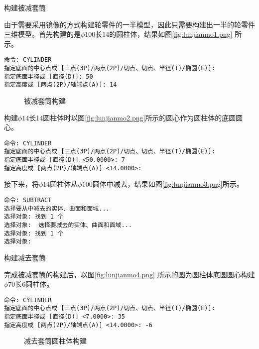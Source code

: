 \begin{procedure}
\item 构建被减套筒

由于需要采用镜像的方式构建轮零件的一半模型，因此只需要构建出一半的轮零件三维模型。首先构建的是$\phi 100$长14的圆柱体，结果如图\ref{fig:lunjianmo1.png} 所示。
\begin{lstlisting}
命令: CYLINDER
指定底面的中心点或 [三点(3P)/两点(2P)/切点、切点、半径(T)/椭圆(E)]:
指定底面半径或 [直径(D)]: 50
指定高度或 [两点(2P)/轴端点(A)]: 14
\end{lstlisting}
\begin{figure}[htbp]
\centering
{}\hspace{20pt}
\hspace{20pt}
\caption{被减套筒构建}
\end{figure}

构建$\phi 14$长14圆柱体时以图\ref{fig:lunjianmo2.png}所示的圆心作为圆柱体的底圆圆心。
\begin{lstlisting}
命令: CYLINDER
指定底面的中心点或 [三点(3P)/两点(2P)/切点、切点、半径(T)/椭圆(E)]:
指定底面半径或 [直径(D)] <50.0000>: 7
指定高度或 [两点(2P)/轴端点(A)] <14.0000>:
\end{lstlisting}

接下来，将$\phi 14$圆柱体从$\phi 100$圆体中减去，结果如图\ref{fig:lunjianmo3.png}所示。
\begin{lstlisting}
命令: SUBTRACT
选择要从中减去的实体、曲面和面域...
选择对象: 找到 1 个
选择对象:  选择要减去的实体、曲面和面域...
选择对象: 找到 1 个
选择对象:
\end{lstlisting}

\item 构建减去套筒

完成被减套筒的构建后，以图\ref{fig:lunjianmo4.png} 所示的圆为圆柱体底圆圆心构建$\phi 70$长6圆柱体。
\begin{lstlisting}
命令: CYLINDER
指定底面的中心点或 [三点(3P)/两点(2P)/切点、切点、半径(T)/椭圆(E)]:
指定底面半径或 [直径(D)] <7.0000>: 35
指定高度或 [两点(2P)/轴端点(A)] <14.0000>: -6
\end{lstlisting}

\begin{figure}[htbp]
\centering
{}\hspace{40pt}
\caption{减去套筒圆柱体构建}
\end{figure}


\end{procedure}
